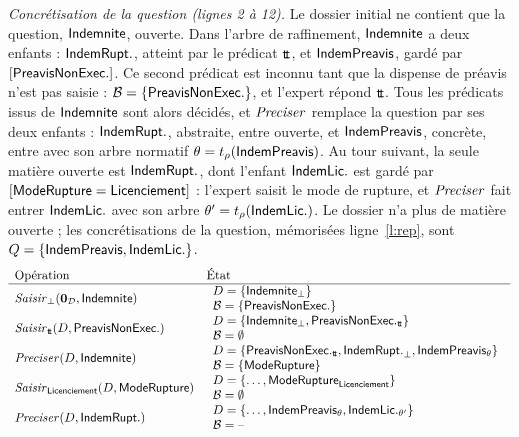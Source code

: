 \documentclass[review]{jflart}
\begin{document}
\emph{Concrétisation de la question (lignes 2 à 12).} Le dossier initial ne
contient que la question, \(\mathsf{Indemnite}\), ouverte. Dans l'arbre de
raffinement, \(\mathsf{Indemnite}\) a deux enfants : \(\mathsf{IndemRupt.}\), atteint par
le prédicat \({\mathsf{t\!t}}\), et \(\mathsf{IndemPreavis}\), gardé par \([\mathsf{PreavisNonExec.}]\). Ce second
prédicat est inconnu tant que la dispense de préavis n'est pas saisie :
\(\mathcal{B}=\{\mathsf{PreavisNonExec.}\}\), et l'expert répond \({\mathsf{t\!t}}\). Tous les prédicats
issus de \(\mathsf{Indemnite}\) sont alors décidés, et \(\mathit{Preciser}\) remplace la
question par ses deux enfants : \(\mathsf{IndemRupt.}\), abstraite, entre ouverte,
et \(\mathsf{IndemPreavis}\), concrète, entre avec son arbre normatif \(\theta=t_\rho(\mathsf{IndemPreavis})\).
Au tour suivant, la seule matière ouverte est \(\mathsf{IndemRupt.}\), dont
l'enfant \(\mathsf{IndemLic.}\) est gardé par \([\mathsf{ModeRupture}=\mathsf{Licenciement}]\) :
l'expert saisit le mode de rupture, et \(\mathit{Preciser}\) fait entrer \(\mathsf{IndemLic.}\)
avec son arbre \(\theta'=t_\rho(\mathsf{IndemLic.})\). Le dossier n'a plus de matière
ouverte ; les concrétisations de la question, mémorisées ligne~\ref{l:rep},
sont \(Q=\{\mathsf{IndemPreavis},\mathsf{IndemLic.}\}\).
\def\state#1#2{\begin{array}{l} D=\{#1\} \\ \mc B=#2 \end{array}}
{\small
\[
\begin{array}{ll}
\hbox{Opération} & \hbox{État} \\
\hline
\Input_\bot(\EmptyD,\Indemnite) & \state{\Indemnite_\bot}{\{\PreavisNE\}} \\[4pt]
\Input_\true(D,\PreavisNE) & \state{\Indemnite_\bot,\PreavisNE_\true}{\emptyset} \\[4pt]
\Precise(D,\Indemnite) & \state{\PreavisNE_\true,\IndemRupture_\bot,\ICP_{\theta}}{\{\ModeRupture\}} \\[4pt]
\Input_\Licenciement(D,\ModeRupture) & \state{\dots,\ModeRupture_{\Licenciement}}{\emptyset} \\[4pt]
\Precise(D,\IndemRupture) & \state{\dots,\ICP_{\theta},\Indem_{\theta'}}{\text{--}} \\
\end{array}
\]
}
\end{document}
